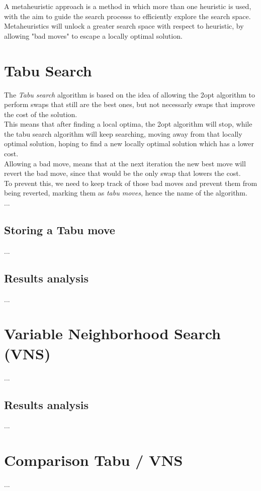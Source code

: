A metaheuristic approach is a method in which more than one heuristic is used, with the aim to guide the search processs to efficiently explore the search space.\\
Metaheuristics will unlock a greater search space with respect to heuristic, by allowing "bad moves" to escape a locally optimal solution.

\section{Tabu Search}
The \textit{Tabu search} algorithm is based on the idea of allowing the 2opt algorithm to perform swaps that still are the best ones, but not necessarly swaps that improve the cost of the solution.\\
This means that after finding a local optima, the 2opt algorithm will stop, while the tabu search algorithm will keep searching, moving away from that locally optimal solution, hoping to find a new locally optimal solution which has a lower cost.\\
Allowing a bad move, means that at the next iteration the new best move will revert the bad move, since that would be the only swap that lowers the cost.\\
To prevent this, we need to keep track of those bad moves and prevent them from being reverted, marking them as \textit{tabu moves}, hence the name of the algorithm.\\

...
\subsection{Storing a Tabu move}
...
\subsection{Results analysis}
...
\section{Variable Neighborhood Search (VNS)}
...
\subsection{Results analysis}
...
\section{Comparison Tabu / VNS}
...